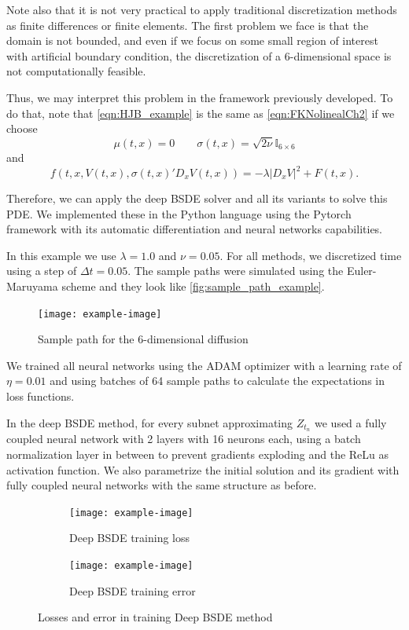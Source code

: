 Note also that it is not very practical to apply traditional discretization methods as finite differences or finite elements. The first problem we face is that the domain is not bounded, and even if we focus on some small region of interest with artificial boundary condition, the discretization of a 6-dimensional space is not computationally feasible.

Thus, we may interpret this problem in the framework previously developed. To do that, note that \eqref{eqn:HJB_example} is the same as \eqref{eqn:FKNolinealCh2} if we choose
\begin{equation}
	\mu(t,x)=0\quad \quad \sigma(t,x)=\sqrt{2\nu} \mathbb{I}_{6\times 6}
\end{equation}
and 
\begin{equation}
	f(t,x,V(t,x),\sigma(t,x)'D_x V(t,x))=-\lambda |D_x V|^2+F(t,x).
\end{equation}

Therefore, we can apply the deep BSDE solver and all its variants to solve this PDE. We implemented these in the Python language using the Pytorch framework with its automatic differentiation and neural networks capabilities.

In this example we use $\lambda=1.0$ and $\nu=0.05$. 
For all methods, we discretized time using a step of $\Delta t=0.05$. The sample paths were simulated using the Euler-Maruyama scheme and they look like \autoref{fig:sample_path_example}.
\begin{figure}[H]
	\centering
	\texttt{[image: example-image]}
	\caption{Sample path for the 6-dimensional diffusion}
	\label{fig:sample_path_example}
\end{figure}



We trained all neural networks using the ADAM optimizer with a learning rate of $\eta=0.01$ and using batches of 64 sample paths to calculate the expectations in loss functions. 

In the deep BSDE method, for every subnet approximating $Z_{t_n}$  we used a fully coupled neural network with 2 layers with 16 neurons each, using a batch normalization layer in between to prevent gradients exploding and the ReLu as activation function. We also parametrize the initial solution and its gradient with fully coupled neural networks with the same structure as before.

\begin{figure}[htb!]		
	\begin{subfigure}{.475\linewidth}
		\texttt{[image: example-image]}
		\caption{Deep BSDE training loss}
		\label{fig:BSDE_loss}
	\end{subfigure}\hfill %
	\begin{subfigure}{.475\linewidth}
		\texttt{[image: example-image]}
		\caption{Deep BSDE training error}
		\label{fig:BSDE_error}
	\end{subfigure}
	\caption{Losses and error in training Deep BSDE method }
	\label{fig:deep_BSDE_training}
\end{figure}

